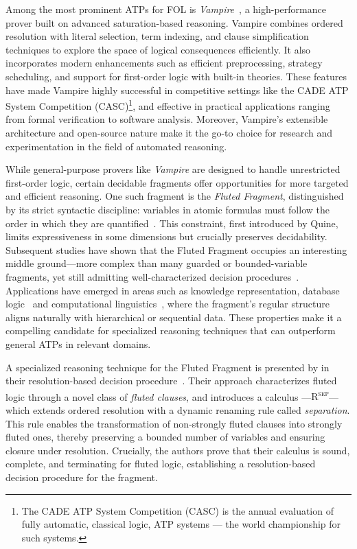 Among the most prominent ATPs for FOL is \emph{Vampire}~\cite{kovacs2013vampire}, a high-performance prover built on advanced saturation-based reasoning.
Vampire combines ordered resolution with literal selection, term indexing, and clause simplification techniques to explore the space of logical consequences efficiently.
It also incorporates modern enhancements such as efficient preprocessing, strategy scheduling, and support for first-order logic with built-in theories.
These features have made Vampire highly successful in competitive settings like the CADE ATP System Competition (CASC)\footnote{The CADE ATP System Competition (CASC) is the annual evaluation of fully automatic, classical logic, ATP systems --- the world championship for such systems.}, and effective in practical applications ranging from formal verification to software analysis.
Moreover, Vampire's extensible architecture and open-source nature make it the go-to choice for research and experimentation in the field of automated reasoning.

While general-purpose provers like \emph{Vampire} are designed to handle unrestricted first-order logic, certain decidable fragments offer opportunities for more targeted and efficient reasoning.
One such fragment is the \emph{Fluted Fragment}, distinguished by its strict syntactic discipline: variables in atomic formulas must follow the order in which they are quantified~\cite{quine1968predicate}.
This constraint, first introduced by Quine, limits expressiveness in some dimensions but crucially preserves decidability. Subsequent studies have shown that the Fluted Fragment occupies an interesting middle ground—more complex than many guarded or bounded-variable fragments, yet still admitting well-characterized decision procedures~\cite{pratt2019fluted}.
Applications have emerged in areas such as knowledge representation, database logic~\cite{pratt-hartmann2023transitivity} and computational linguistics~\cite{quine1968predicate}, where the fragment’s regular structure aligns naturally with hierarchical or sequential data.
These properties make it a compelling candidate for specialized reasoning techniques that can outperform general ATPs in relevant domains.

A specialized reasoning technique for the Fluted Fragment is presented by \citeauthor{schmidt2000resolution} in their resolution-based decision procedure~\cite{schmidt2000resolution}.
Their approach characterizes fluted logic through a novel class of \emph{fluted clauses}, and introduces a calculus ---\textsc{R\textsuperscript{sep}}--- which extends ordered resolution with a dynamic renaming rule called \emph{separation}.
This rule enables the transformation of non-strongly fluted clauses into strongly fluted ones, thereby preserving a bounded number of variables and ensuring closure under resolution.
Crucially, the authors prove that their calculus is sound, complete, and terminating for fluted logic, establishing a resolution-based decision procedure for the fragment.

